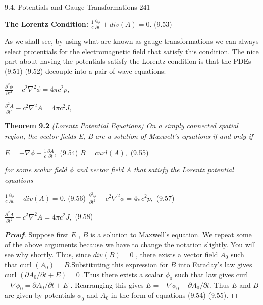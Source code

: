 \documentclass[12pt]{article}
\begin{document}
\hfill 9.4. Potentials and Gauge Transformations   241

\textbf{The Lorentz Condition:}
\vfill
\hfill $\frac{1}{c} \frac{\partial \phi}{\partial t} + div (A) = 0$. \hfill (9.53)

\vfill
\noindent As we shall see, by using what are known as gauge transformations we can always select protentials for the electromagnetic field that satisfy this condition. The nice part about having the potentials satisfy the Lorentz condition is that the PDEs (9.51)-(9.52) decouple into a pair of wave equations:



\vfill


\centerline{ $ \frac{\partial^2 \phi}{\partial t^2} - c^2\nabla^2 \phi=4\pi c^2p,$ }

\vfill
\centerline{ $ \frac{\partial^2 A}{\partial t^2} - c^2\nabla^2 A=4\pi c^2 J,$}




\vfill 




\textbf{Theorem 9.2}  \hspace{5pt}  \textit{(Lorentz Potential Equations) On a simply connected spatial region, the vector fields E, B are a solution of Maxwell's equations if and only if}

\vfill

\hfill $E = -\nabla \phi - \frac{1}{c} \frac{\partial A}{\partial t} , $ \hfill (9.54)
\vfill
\hfill $ B=curl(A),$ \hfill (9.55)

\vfill


\noindent \textit{for some scalar field $\phi$ and vector field $A$ that satisfy the Lorentz potential equations}

\vfill
\hfill $\frac{1}{c} \frac{\partial \phi}{\partial t} + div (A) = 0$. \hfill (9.56)
\vfill
\hfill $ \frac{\partial^2 \phi}{\partial t^2} - c^2\nabla^2 \phi=4\pi c^2p,$  \hfill (9.57)

\vfill
\hfill $ \frac{\partial^2 A}{\partial t^2} - c^2\nabla^2 A=4\pi c^2 J,$ \hfill (9.58)


\vfill
\vfill




\begin{proof}[\textbf{Proof}]
Suppose first $E$ , $B$ is a solution to Maxwell's equation. We repeat some of the above arguments because we have to change the notation slightly. You will see why shortly. Thus, since $div (B) = 0 $ , there exists a vector field $A_0$ such that curl $(A_0) = B$.Substituting this expression for $B$ into Faraday's law gives curl $ (\partial A_0 / \partial t +E) =0$ .Thus there exists a scalar $\phi_0$ such that law gives curl $- \nabla \phi_0 = \partial A_0 / \partial t + E$ . Rearranging this gives $E = - \nabla \phi_0 - \partial A_0 / \partial t$. Thus $E$ and $B$ are given by potentials  $\phi_0$ and $A_0$ in the form of equations (9.54)-(9.55). 
\end{proof}
\end{document}
